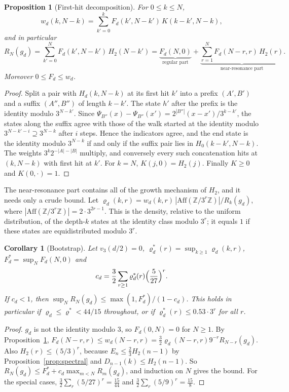 \documentclass[11pt]{article}
\newtheorem{proposition}[theorem]{Proposition}
\newtheorem{corollary}[theorem]{Corollary}
\theoremstyle{remark}
\newcommand{\Z}{\mathbb Z}
\begin{document}
\begin{proposition}[First-hit decomposition]\label{prop:renewal}
For $0\le k\le N$,
\[
 w_d(k,N-k)=\sum_{k'=0}^kF_d(k',N-k')\,K(k-k',N-k),
\]
and in particular
\[
 R_N(g_d)=\sum_{k'=0}^NF_d(k',N-k')\,H_2(N-k')=\underbrace{F_d(N,0)}_{\text{regular part}}+\underbrace{\sum_{r=1}^NF_d(N-r,r)\,H_2(r)}_{\text{near-resonance part}} .
\]
Moreover $0\le F_d\le w_d$.
\end{proposition}

\begin{proof}
Split a pair with $H_d(k,N-k)$ at its first hit $k'$ into a prefix $(A',B')$ and a suffix $(A'',B'')$ of length $k-k'$. The state $h'$ after the prefix is the identity modulo $3^{N-k'}$. Since $\Psi_{B''}(x)-\Psi_{B''}(x')=2^{|B''|}(x-x')/3^{k-k'}$, the states along the suffix agree with those of the walk started at the identity modulo $3^{N-k'-i}\supseteq3^{N-k}$ after $i$ steps. Hence the indicators agree, and the end state is the identity modulo $3^{N-k}$ if and only if the suffix pair lies in $H_0(k-k',N-k)$. The weights $3^k2^{-|A|-|B|}$ multiply, and conversely every such concatenation hits at $(k,N-k)$ with first hit at $k'$. For $k=N$, $K(j,0)=H_2(j)$. Finally $K\ge0$ and $K(0,\cdot)=1$.
\end{proof}

The near-resonance part contains all of the growth mechanism of $H_2$, and it needs only a crude bound. Let $\varrho_d(k,r)=w_d(k,r)\,|\mathrm{Aff}(\Z/3^r\Z)|/R_k(g_d)$, where $|\mathrm{Aff}(\Z/3^r\Z)|=2\cdot3^{2r-1}$. This is the density, relative to the uniform distribution, of the depth-$k$ states at the identity class modulo $3^r$; it equals $1$ if these states are equidistributed modulo $3^r$.

\begin{corollary}[Bootstrap]\label{cor:bootstrap}
Let $v_3(d/2)=0$, $\varrho^*_d(r)=\sup_{k\ge1}\varrho_d(k,r)$, $F^*_d=\sup_NF_d(N,0)$ and
\[
 c_d=\frac32\sum_{r\ge1}\varrho^*_d(r)\Bigl(\frac5{27}\Bigr)^r .
\]
If $c_d<1$, then $\sup_NR_N(g_d)\le\max(1,F^*_d)/(1-c_d)$. This holds in particular if $\varrho_d\le\varrho^*<44/15$ throughout, or if $\varrho^*_d(r)\le0.53\cdot3^r$ for all $r$.
\end{corollary}

\begin{proof}
$g_d$ is not the identity modulo $3$, so $F_d(0,N)=0$ for $N\ge1$. By Proposition~\ref{prop:renewal}, $F_d(N-r,r)\le w_d(N-r,r)=\frac32\varrho_d(N-r,r)9^{-r}R_{N-r}(g_d)$. Also $H_2(r)\le(5/3)^r$, because $E_n\le\frac23H_2(n-1)$ by Proposition~\ref{prop:spectral} and $D_{n-1}(k)\le H_2(n-1)$. So $R_N(g_d)\le F^*_d+c_d\max_{m<N}R_m(g_d)$, and induction on $N$ gives the bound. For the special cases, $\frac32\sum_r(5/27)^r=\frac{15}{44}$ and $\frac32\sum_r(5/9)^r=\frac{15}8$.
\end{proof}
\end{document}

